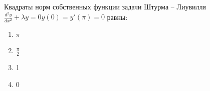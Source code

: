 Квадраты норм собственных функции задачи Штурма -- Лиувилля  \(\frac{d^2y}{dx^2}+\lambda y=0 y\left(0\right)=y'\left(\pi \right)=0\) равны:

\begin{enumerate}[label=\arabic*)]
    \item \(\pi\)
    \item \(\frac{\pi }{2}\)
    \item 1
    \item 0
\end{enumerate}

